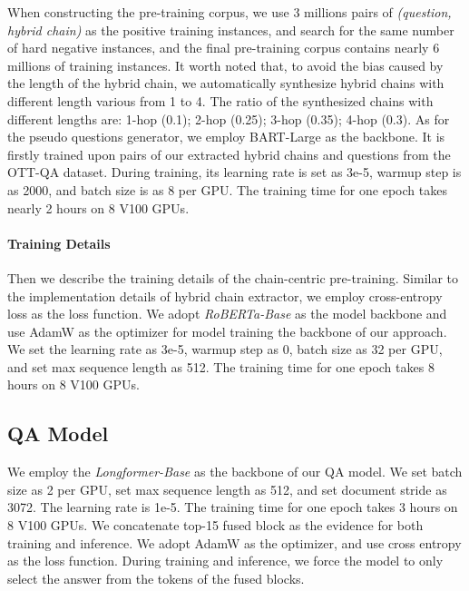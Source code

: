 \documentclass[11pt]{article}
\begin{document}
When constructing the pre-training corpus, we use 3 millions pairs of \textit{(question, hybrid chain)} as the positive training instances, and search for the same number of hard negative instances, and the final pre-training corpus contains nearly 6 millions of training instances. 
It worth noted that, to avoid the bias caused by the length of the hybrid chain, we automatically synthesize hybrid chains with different length various from 1 to 4. 
The ratio of the synthesized chains with different lengths are: 1-hop (0.1); 2-hop (0.25); 3-hop (0.35); 4-hop (0.3). 
As for the pseudo questions generator, we employ BART-Large as the backbone.
It is firstly trained upon pairs of our extracted hybrid chains and questions from the OTT-QA dataset.
During training, its learning rate is set as 3e-5, warmup step is as 2000, and batch size is as 8 per GPU.
The training time for one epoch takes nearly 2 hours on 8 V100 GPUs.

\paragraph{Training Details}

Then we describe the training details of the chain-centric pre-training. 
Similar to the implementation details of hybrid chain extractor, we employ cross-entropy loss as the
loss function. 
We adopt \textit{RoBERTa-Base} \cite{Liu2019RoBERTaAR} as the model backbone and use AdamW as the optimizer for model training
the backbone of our approach. We set the learning rate as 3e-5, warmup
step as 0, batch size as 32 per GPU, and set max sequence
length as 512. The training time for one
epoch takes 8 hours on 8 V100 GPUs.
\subsection{QA Model}
We employ the \textit{Longformer-Base} \cite{beltagy2020longformer} as the backbone of our QA model. We set batch size as 2 per GPU, set max sequence length as 512, and set document stride as 3072. The learning rate is 1e-5. The training time for one
epoch takes 3 hours on 8 V100 GPUs.
We concatenate top-15 fused block as the evidence for both training and inference. We adopt AdamW as the optimizer, and use cross entropy as the loss function. During training and inference, we force the model to only select the answer from the tokens of the fused blocks. 

	
\end{document}
